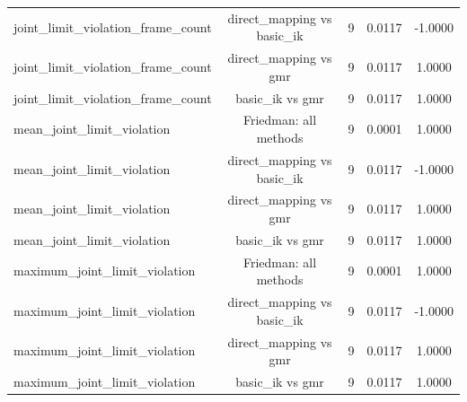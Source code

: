 \begin{table}[t]
{\begin{tabular}{lcccc}
joint\_limit\_violation\_frame\_count & direct\_mapping vs basic\_ik & 9 & 0.0117 & -1.0000 \\
joint\_limit\_violation\_frame\_count & direct\_mapping vs gmr & 9 & 0.0117 & 1.0000 \\
joint\_limit\_violation\_frame\_count & basic\_ik vs gmr & 9 & 0.0117 & 1.0000 \\
mean\_joint\_limit\_violation & Friedman: all methods & 9 & 0.0001 & 1.0000 \\
mean\_joint\_limit\_violation & direct\_mapping vs basic\_ik & 9 & 0.0117 & -1.0000 \\
mean\_joint\_limit\_violation & direct\_mapping vs gmr & 9 & 0.0117 & 1.0000 \\
mean\_joint\_limit\_violation & basic\_ik vs gmr & 9 & 0.0117 & 1.0000 \\
maximum\_joint\_limit\_violation & Friedman: all methods & 9 & 0.0001 & 1.0000 \\
maximum\_joint\_limit\_violation & direct\_mapping vs basic\_ik & 9 & 0.0117 & -1.0000 \\
maximum\_joint\_limit\_violation & direct\_mapping vs gmr & 9 & 0.0117 & 1.0000 \\
maximum\_joint\_limit\_violation & basic\_ik vs gmr & 9 & 0.0117 & 1.0000 \\
\hline
\end{tabular}%
}
\end{table}
